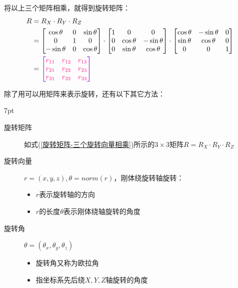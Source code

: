\documentclass{article}
\newenvironment{formal}{%
	\def\FrameCommand{%
		\hspace{1pt}%
		{\color{DarkBlue}\vrule width 2pt}%
		{\color{formalshade}\vrule width 4pt}%
		\colorbox{formalshade}%
	}%
	\MakeFramed{\advance\hsize-\width\FrameRestore}%
	\noindent\hspace{-4.55pt}%
	\begin{adjustwidth}{}{7pt}%
		\vspace{2pt}\vspace{2pt}%
	}	{%
		\vspace{2pt}\end{adjustwidth}\endMakeFramed%
}
\begin{document}
将以上三个矩阵相乘，就得到旋转矩阵：
\begin{align}
	R&=R_X\cdot R_Y\cdot R_Z \label{旋转矩阵-三个旋转向量相乘}
	\\
	&=\left[ \begin{matrix}
		\cos \theta&		0&		\sin \theta\\
		0&		1&		0\\
		-\sin \theta&		0&		\cos \theta\\
	\end{matrix} \right] \cdot \left[ \begin{matrix}
		1&		0&		0\\
		0&		\cos \theta&		-\sin \theta\\
		0&		\sin \theta&		\cos \theta\\
	\end{matrix} \right] \cdot \left[ \begin{matrix}
		\cos \theta&		-\sin \theta&		0\\
		\sin \theta&		\cos \theta&		0\\
		0&		0&		1\\
	\end{matrix} \right]  \nonumber
	\\
	&={\color[RGB]{128, 0, 255} \left[ {\color[RGB]{255, 0, 128} \begin{matrix}
				r_{11}&		r_{12}&		r_{13}\\
				r_{21}&		r_{22}&		r_{23}\\
				r_{31}&		r_{32}&		r_{33}\\
		\end{matrix}} \right] } \label{旋转矩阵-抽象形式}
\end{align}

除了用可以用矩阵来表示旋转，还有以下其它方法：
\begin{formal}
		\begin{description}
		\item[旋转矩阵] 如式(\ref{旋转矩阵-三个旋转向量相乘})所示的$3\times 3$矩阵$R=R_X\cdot R_Y\cdot R_Z$
		\item[旋转向量] $r=\left( x,y,z \right) ,\theta =norm\left( r \right) $，刚体绕旋转轴旋转：
		\begin{itemize}
			\item $r$表示旋转轴的方向
			\item $r$的长度$\theta$表示刚体绕轴旋转的角度
		\end{itemize}
		\item[旋转角] $\theta =\left( \theta _x,\theta _y,\theta _z \right) $
		\begin{itemize}
			\item 旋转角又称为欧拉角
			\item 指坐标系先后绕$X,Y,Z$轴旋转的角度
		\end{itemize}
	\end{description}
\end{formal}
\end{document}
